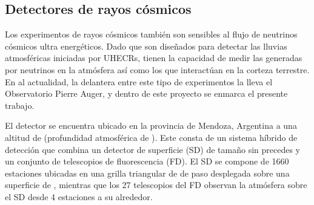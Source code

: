 	\subsection{Detectores de rayos c\'osmicos}
	
	Los experimentos de rayos c\'osmicos tambi\'en son sensibles al flujo de neutrinos c\'osmicos ultra energ\'eticos. 
	Dado que son dise\~nados para detectar las lluvias atmosf\'ericas iniciadas por UHECRs, tienen la capacidad de medir las generadas por neutrinos en la atm\'osfera as\'i como los que interact\'uan en la corteza terrestre.
	En al actualidad, la delantera entre este tipo de experimentos la lleva el Observatorio Pierre Auger, y dentro de este proyecto se enmarca el presente trabajo. 	
      \fi %




	El detector se encuentra ubicado en la provincia de Mendoza, Argentina a una altitud de  (profundidad atmosf\'erica de ).
	Este consta de un sistema h\'ibrido de detecci\'on que combina un detector de superficie (SD) de tama\~no sin precedes y un conjunto de telescopios de fluorescencia (FD).
	El SD se compone de 1660 estaciones \cher{} ubicadas en una grilla triangular de  de paso desplegada sobre una superficie de , mientras que los 27 telescopios del FD observan la atm\'osfera sobre el SD desde 4 estaciones a su alrededor.
	\fi %


